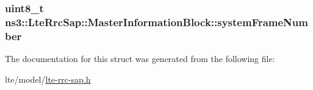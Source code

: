 \subsubsection[{\texorpdfstring{system\+Frame\+Number}{systemFrameNumber}}]{\setlength{\rightskip}{0pt plus 5cm}uint8\+\_\+t ns3\+::\+Lte\+Rrc\+Sap\+::\+Master\+Information\+Block\+::system\+Frame\+Number}\hypertarget{structns3_1_1LteRrcSap_1_1MasterInformationBlock_a916d46a429b91317c9adfdd6f651f059}{}\label{structns3_1_1LteRrcSap_1_1MasterInformationBlock_a916d46a429b91317c9adfdd6f651f059}


The documentation for this struct was generated from the following file\+:\begin{DoxyCompactItemize}
\item 
lte/model/\hyperlink{lte-rrc-sap_8h}{lte-\/rrc-\/sap.\+h}\end{DoxyCompactItemize}

